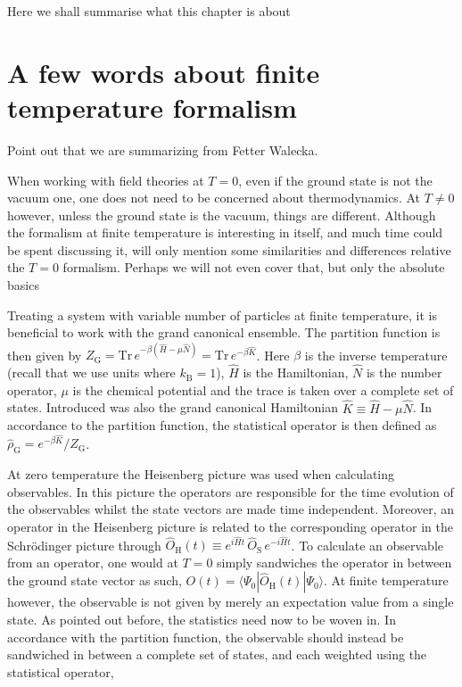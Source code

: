 \documentclass[12pt]{report}
\newcommand{\todo}[1]{{\leavevmode\color{todo}#1}}
\begin{document}
\todo{Here we shall summarise what this chapter is about}

\section{A few words about finite temperature formalism}

\todo{Point out that we are summarizing from Fetter Walecka.}

When working with field theories at $ T = 0 $, even if the ground state is not the vacuum one, one does not need to be concerned about thermodynamics. At $ T \neq 0 $ however, unless the ground state is the vacuum, things are different. Although the formalism at finite temperature is interesting in itself, and much time could be spent discussing it, will only mention some similarities and differences relative the $ T = 0 $ formalism. \todo{Perhaps we will not even cover that, but only the absolute basics}

Treating a system with variable number of particles at finite temperature, it is beneficial to work with the grand canonical ensemble. The partition function is then given by $ Z_\text{G} = \text{Tr} \, e^{-\beta (\hat H - \mu \hat N)} = \text{Tr} \, e^{-\beta \hat K} $. Here $ \beta $ is the inverse temperature (recall that we use units where $ k_\text{B} = 1 $), $ \hat H $ is the Hamiltonian, $ \hat N $ is the number operator, $ \mu $ is the chemical potential and the trace is taken over a complete set of states. Introduced was also the grand canonical Hamiltonian $ \hat K \equiv \hat H - \mu \hat N $. In accordance to the partition function, the statistical operator is then defined as $ \hat \rho_\text{G} = e^{-\beta \hat K} / Z_\text{G} $.

At zero temperature the Heisenberg picture was used when calculating observables. In this picture the operators are responsible for the time evolution of the observables whilst the state vectors are made time independent. Moreover, an operator in the Heisenberg picture is related to the corresponding operator in the Schrödinger picture through $ \hat O_\text{H}(t) \equiv e^{i \hat H t} \, \hat O_\text{S} \, e^{-i \hat H t} $. To calculate an observable from an operator, one would at $ T = 0 $ simply sandwiches the operator in between the ground state vector as such, $ O(t) = \langle \Psi_0 |  \hat O_\text{H}(t)  | \Psi_0 \rangle $. At finite temperature however, the observable is not given by merely an expectation value from a single state. As pointed out before, the statistics need now to be woven in. In accordance with the partition function, the observable should instead be sandwiched in between a complete set of states, and each weighted using the statistical operator,
\end{document}

